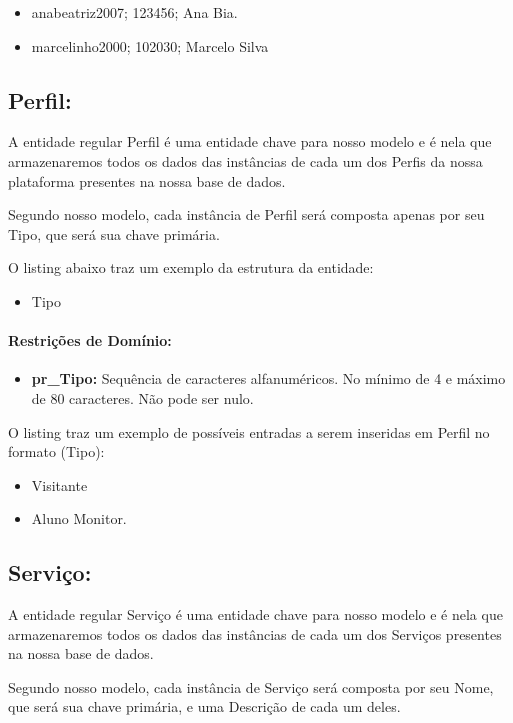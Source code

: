 \documentclass{report}
\begin{document}
\begin{itemize}
  \item anabeatriz2007; 123456; Ana Bia. 
  \item marcelinho2000; 102030; Marcelo Silva
\end{itemize}
\subsection{Perfil:}
  A entidade regular Perfil é uma entidade chave para nosso modelo e é nela que armazenaremos todos os dados das instâncias de cada um dos Perfis da nossa plataforma presentes na nossa base de dados.
  
  Segundo nosso modelo, cada instância de Perfil será composta apenas por seu Tipo, que será sua chave primária.
    
  O listing abaixo traz um exemplo da estrutura da entidade:
\begin{itemize}
  \item Tipo
\end{itemize}
\paragraph{Restrições de Domínio:}
\begin{itemize}
  \item \textbf{pr\_Tipo:} Sequência de caracteres alfanuméricos. No mínimo de 4 e máximo de 80 caracteres. Não pode ser nulo.
\end{itemize}
O listing traz um exemplo de possíveis entradas a serem inseridas em Perfil no formato (Tipo):

\begin{itemize}
  \item Visitante
  \item Aluno Monitor.
\end{itemize}
\subsection{Serviço:}
  A entidade regular Serviço é uma entidade chave para nosso modelo e é nela que armazenaremos todos os dados das instâncias de cada um dos Serviços presentes na nossa base de dados.
  
  Segundo nosso modelo, cada instância de Serviço será composta por seu Nome, que será sua chave primária, e uma Descrição de cada um deles. 
    
\end{document}
